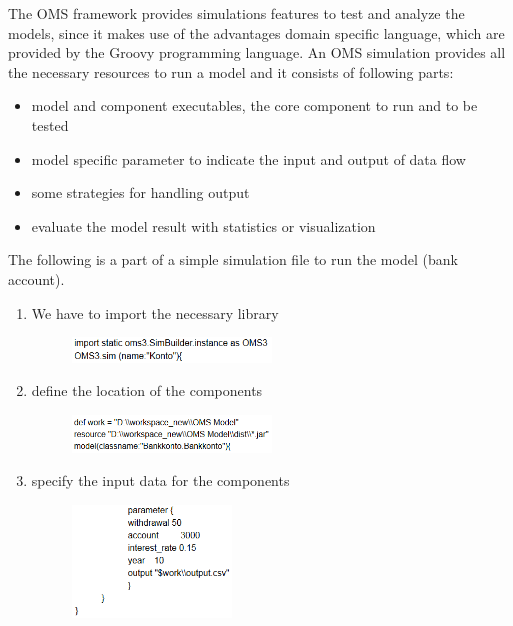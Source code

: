 The OMS framework provides simulations features to test and analyze the models, since it makes use of the advantages domain specific language, which are provided by the Groovy programming language. An OMS simulation provides all the necessary resources to run a model and it consists of following parts:
\begin{itemize}
	\item model and component executables, the core component to run and to be tested
	\item model specific parameter to indicate the input and output of data flow
	\item some strategies for handling output
	\item evaluate the model result with statistics or visualization
\end{itemize}

The following is a part of a simple simulation file to run the model (bank account).
\begin{enumerate}
\item We have to import the necessary library
\begin{figure}[htbp]
\includegraphics[width=0.5\textwidth]{pics/oms/Figure6.png}
\end{figure}

\item define the location of the components
\begin{figure}[htbp]
\includegraphics[width=0.5\textwidth]{pics/oms/Figure7.png}
\end{figure}

\item specify the input data for the components
\begin{figure}[htbp]
\includegraphics[width=0.4\textwidth]{pics/oms/Figure8.png}
\end{figure}
\end{enumerate}

